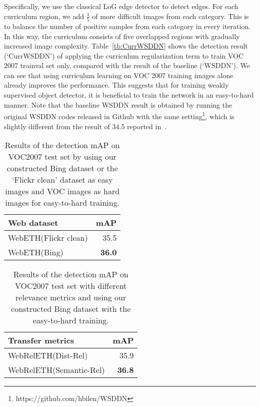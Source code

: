 \documentclass[10pt,twocolumn,letterpaper]{article}
\begin{document}
Specifically, we use the classical LoG edge detector to detect edges. For each curriculum region, we add $\frac{1}{5}$ of more difficult images from each category. This is to balance the number of positive samples from each category in every iteration. In this way, the curriculum consists of five overlapped regions with gradually increased image complexity. Table~\ref{tb:CurrWSDDN} shows the detection result (`CurrWSDDN') of applying the curriculum regularization term to train VOC 2007 trainval set only, compared with the result of the baseline (`WSDDN'). We can see that using curriculum learning on VOC 2007 training images alone already improves the performance. This suggests that for training weakly supervised object detector, it is beneficial to train the network in an easy-to-hard manner. Note that the baseline WSDDN result is obtained by running the original WSDDN codes released in Github with the same setting\footnote{https://github.com/hbilen/WSDDN}, which is slightly different from the result of 34.5 reported in~\cite{bilen2016weakly}. 


\begin{table}
\centering
\caption{Results of the detection mAP on VOC2007 test set by using our constructed Bing dataset or the `Flickr clean' dataset as easy images and VOC images as hard images for easy-to-hard training. } \label{tb:WebETH}
\begin{tabular}{| l | r | }
\hline
Web dataset & mAP\\ \hline
\hline
WebETH(Flickr clean)& 35.5 \\ \hline
WebETH(Bing)& \textbf{36.0} \\ \hline
\end{tabular}
\end{table}

\begin{table}
\centering
\caption{Results of the detection mAP on VOC2007 test set with different relevance metrics and using our constructed Bing dataset with the easy-to-hard training. }\label{tb:WebRelETH}
\begin{tabular}{| l | r | }
\hline
Transfer metrics & mAP\\ \hline
\hline
WebRelETH(Dist-Rel)& {35.9} \\ \hline
WebRelETH(Semantic-Rel)& \textbf{36.8} \\ \hline
\end{tabular}
\end{table}
\end{document}
